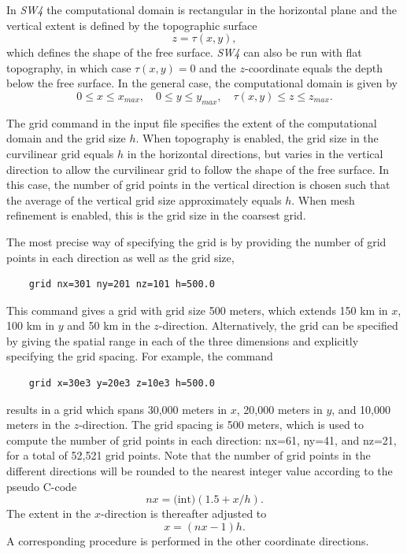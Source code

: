 \documentclass[11pt]{report}
\begin{document}
In \emph{SW4} the computational domain is rectangular in the horizontal plane and the vertical extent
is defined by the topographic surface
\[
z=\tau(x,y),
\]
which defines the shape of the free surface. \emph{SW4} can also be run with flat topography, in
which case $\tau(x,y)=0$ and the $z$-coordinate equals the depth below the free surface. In the general
case, the computational domain is given by
\begin{equation}\label{eq:domain}
0\leq x\leq x_{max},\quad 0\leq y\leq y_{max},\quad \tau(x,y) \leq z \leq z_{max}.
\end{equation}

The grid command in the input file specifies the extent of the computational domain and the grid
size $h$. When topography is enabled, the grid size in the curvilinear grid equals $h$ in the
horizontal directions, but varies in the vertical direction to allow the curvilinear grid to follow
the shape of the free surface. In this case, the number of grid points in the vertical direction is
chosen such that the average of the vertical grid size approximately equals $h$.
When mesh refinement is enabled, this is the grid size in the coarsest grid. 

The most precise way of specifying the grid is by providing the number of grid points in each
direction as well as the grid size,
%
\begin{verbatim}
	grid nx=301 ny=201 nz=101 h=500.0 
\end{verbatim}
%
This command gives a grid with grid size 500 meters, which extends 150 km in $x$, 100 km in $y$ and
50 km in the $z$-direction. Alternatively, the grid can be specified by giving the spatial range in
each of the three dimensions and explicitly specifying the grid spacing. For example, the command
%
\begin{verbatim}
	grid x=30e3 y=20e3 z=10e3 h=500.0 
\end{verbatim}
%
results in a grid which spans 30,000 meters in $x$, 20,000 meters in $y$, and 10,000
meters in the $z$-direction.  The grid spacing is 500 meters, which is used to compute the
number of grid points in each direction: nx=61, ny=41, and nz=21, for a total of
52,521 grid points. Note that the number of grid points in the different directions will be
rounded to the nearest integer value according to the pseudo C-code
\begin{equation}\label{eq:nx-calculation}
nx = \mbox{(int)} (1.5 + x/h).
\end{equation}
The extent in the $x$-direction is thereafter adjusted to
\begin{equation}\label{eq:x-calculation}
x=(nx-1) h.
\end{equation}
A corresponding procedure is performed in the other coordinate directions.
\end{document}
